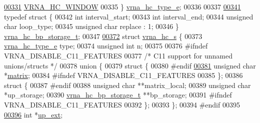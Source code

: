 \begin{DoxyCode}
\hyperlink{constraints__hard_8h_a0fcb8bda9b3712e14f8f513def112435a876c110b3de8e8c89ba5824b08cadb74}{00331}   \hyperlink{constraints__hard_8h_a0fcb8bda9b3712e14f8f513def112435a876c110b3de8e8c89ba5824b08cadb74}{VRNA\_HC\_WINDOW}    
00335 \} \hyperlink{constraints__hard_8h_a0fcb8bda9b3712e14f8f513def112435}{vrna\_hc\_type\_e};
00336 
00337 
\hyperlink{structvrna__hc__bp__storage__t}{00341} \textcolor{keyword}{typedef} \textcolor{keyword}{struct }\{
00342   \textcolor{keywordtype}{int}           interval\_start;
00343   \textcolor{keywordtype}{int}           interval\_end;
00344   \textcolor{keywordtype}{unsigned} \textcolor{keywordtype}{char} loop\_type;
00345   \textcolor{keywordtype}{unsigned} \textcolor{keywordtype}{char} replace : 1;
00346 \} \hyperlink{structvrna__hc__bp__storage__t}{vrna\_hc\_bp\_storage\_t};
00347 
\hyperlink{group__hard__constraints}{00372} \textcolor{keyword}{struct }\hyperlink{group__hard__constraints_structvrna__hc__s}{vrna\_hc\_s} \{
00373   \hyperlink{constraints__hard_8h_a0fcb8bda9b3712e14f8f513def112435}{vrna\_hc\_type\_e}  type;
00374   \textcolor{keywordtype}{unsigned} \textcolor{keywordtype}{int}    n;
00375 
00376 \textcolor{preprocessor}{#ifndef VRNA\_DISABLE\_C11\_FEATURES}
00377   \textcolor{comment}{/* C11 support for unnamed unions/structs */}
00378   \textcolor{keyword}{union }\{
00379     \textcolor{keyword}{struct }\{
00380 \textcolor{preprocessor}{#endif}
\hyperlink{group__hard__constraints_a6ff99f530ca7ca9719e164321d051bde}{00381}       \textcolor{keywordtype}{unsigned} \textcolor{keywordtype}{char} *\hyperlink{group__hard__constraints_a6ff99f530ca7ca9719e164321d051bde}{matrix};     
00384 \textcolor{preprocessor}{#ifndef VRNA\_DISABLE\_C11\_FEATURES}
00385     \};
00386     \textcolor{keyword}{struct }\{
00387 \textcolor{preprocessor}{#endif}
00388       \textcolor{keywordtype}{unsigned} \textcolor{keywordtype}{char}         **matrix\_local;
00389       \textcolor{keywordtype}{unsigned} \textcolor{keywordtype}{char}         *up\_storage;
00390       \hyperlink{structvrna__hc__bp__storage__t}{vrna\_hc\_bp\_storage\_t}  **bp\_storage;
00391 \textcolor{preprocessor}{#ifndef VRNA\_DISABLE\_C11\_FEATURES}
00392     \};
00393   \};
00394 \textcolor{preprocessor}{#endif}
00395 
\hyperlink{group__hard__constraints_a60094038af04093b2fee9b883266ff75}{00396}   \textcolor{keywordtype}{int}                         *\hyperlink{group__hard__constraints_a60094038af04093b2fee9b883266ff75}{up\_ext};    

\end{DoxyCode}
